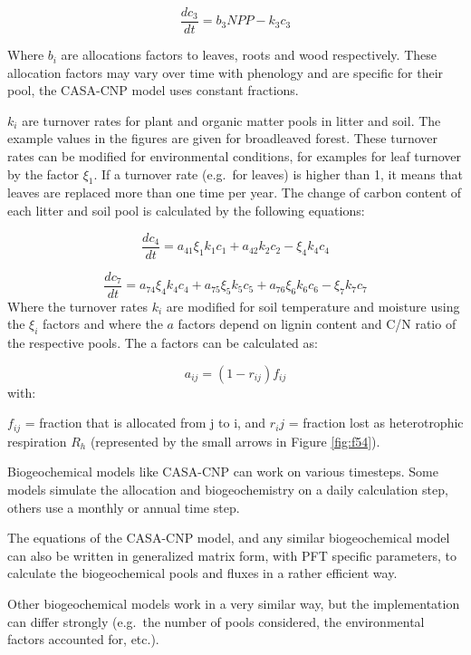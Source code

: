 \documentclass[12pt,oneside]{book}
\begin{document}
\[\frac{dc_3}{dt} = b_3 NPP - k_3 c_3 \]

Where \(b_i\) are allocations factors to leaves, roots and wood
respectively. These allocation factors may vary over time with phenology
and are specific for their pool, the CASA-CNP model uses constant
fractions.

\(k_i\) are turnover rates for plant and organic matter pools in litter
and soil. The example values in the figures are given for broadleaved
forest. These turnover rates can be modified for environmental
conditions, for examples for leaf turnover by the factor \(\xi_1\). If a
turnover rate (e.g.~for leaves) is higher than 1, it means that leaves
are replaced more than one time per year. The change of carbon content
of each litter and soil pool is calculated by the following equations:

\[\frac{dc_4}{dt} = a_{41} \xi_1 k_1 c_1 + a_{42} k_2 c_2 - \xi_4 k_4 c_4 \]

\[\frac{dc_7}{dt} = a_{74} \xi_4 k_4 c_4 + a_{75} \xi_5 k_5 c_5 + a_{76} \xi_6 k_6 c_6 - \xi_7 k_7 c_7 \]
Where the turnover rates \(k_i\) are modified for soil temperature and
moisture using the \(\xi_i\) factors and where the \(a\) factors depend
on lignin content and C/N ratio of the respective pools. The a factors
can be calculated as:

\[a_{ij} = (1 - r_{ij}) f_{ij} \] with:

\(f_{ij}\) = fraction that is allocated from j to i, and \(r_ij\) =
fraction lost as heterotrophic respiration \(R_h\) (represented by the
small arrows in Figure \ref{fig:f54}).

Biogeochemical models like CASA-CNP can work on various timesteps. Some
models simulate the allocation and biogeochemistry on a daily
calculation step, others use a monthly or annual time step.

The equations of the CASA-CNP model, and any similar biogeochemical
model can also be written in generalized matrix form, with PFT specific
parameters, to calculate the biogeochemical pools and fluxes in a rather
efficient way.

Other biogeochemical models work in a very similar way, but the
implementation can differ strongly (e.g.~the number of pools considered,
the environmental factors accounted for, etc.).
\end{document}

